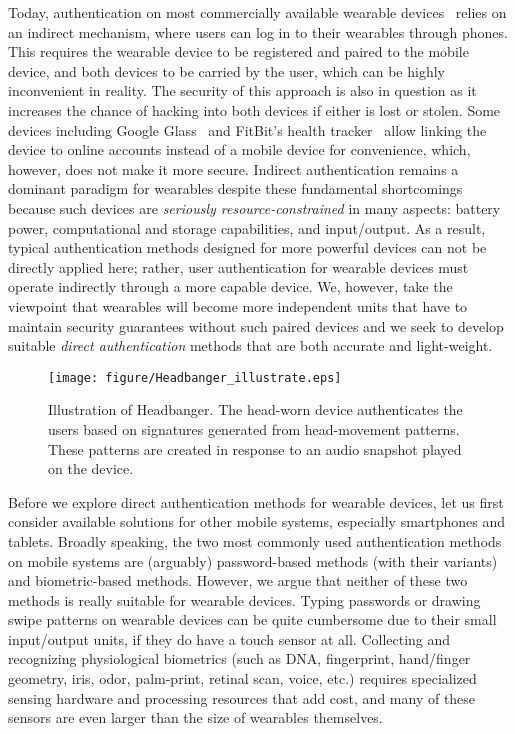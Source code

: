 \vspace{1mm}
Today, authentication on most commercially available wearable devices~\cite{fitbit, smartwatch} relies on an indirect mechanism, where users
can log in to their wearables through phones. This requires the wearable
device to be registered and paired to the mobile device, and both devices to be carried by the user, which can be highly inconvenient in reality. The security of this
approach is also in question as it increases the chance of hacking into both
devices if either is lost or stolen. Some devices including
Google Glass~\cite{googleglass} and FitBit's health tracker~\cite{fitbit}
allow linking the device to online accounts instead of a mobile device for
convenience,  which, however, does not make it more secure. Indirect authentication
remains a
dominant paradigm for wearables despite these fundamental shortcomings because
such devices are \emph{seriously resource-constrained} in many aspects:
battery power, computational and storage capabilities, and input/output. As a result, typical authentication methods designed for more
powerful devices can not be directly applied here; rather, user authentication for wearable devices must operate indirectly
through a more capable device. We, however, take the viewpoint that wearables will become more independent
units that have to maintain security guarantees without such paired devices
and we seek to develop suitable \emph{direct authentication} methods that are
both accurate and light-weight.
\vspace{-1mm}
\begin{figure}[t!]
\centering
\texttt{[image: figure/Headbanger\_illustrate.eps]}
\caption{Illustration of Headbanger. The head-worn device authenticates the
users based on signatures generated from head-movement patterns.  These patterns are created in
response to an audio snapshot played on the device.}
\label{fig:headbanger-illustrate}
\end{figure}

Before we explore direct authentication methods for wearable devices, let us
first consider available solutions for other mobile systems, especially
smartphones and tablets. Broadly speaking, the two most commonly used
authentication methods on mobile systems are (arguably) password-based methods
(with their variants) and biometric-based methods. However, we argue that
neither of these two methods is really suitable for wearable devices. Typing
passwords or drawing swipe patterns on wearable devices can be quite
cumbersome due to their small input/output units, if they do have a touch
sensor at all. Collecting and recognizing physiological biometrics (such as
DNA, fingerprint, hand/finger geometry, iris, odor, palm-print, retinal scan,
voice, etc.) requires specialized sensing hardware and processing resources
that add cost, and many of these sensors are even larger than the size of wearables
themselves.

